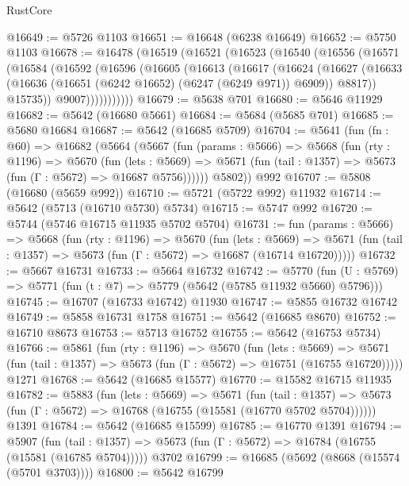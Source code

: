 \begin{lexlean}{RustCore}
\begin{coremodule}
@16649 := @5726 @1103
@16651 := @16648 (@6238 @16649)
@16652 := @5750 @1103
@16678 := @16478
    (@16519
      (@16521
        (@16523
          (@16540
            (@16556
              (@16571
                (@16584
                  (@16592
                    (@16596
                      (@16605
                        (@16613
                          (@16617
                            (@16624
                              (@16627
                                (@16633
                                  (@16636 (@16651 (@6242 @16652) (@6247 (@6249 @971)) @6909))
                                  @8817))
                              @15735))
                          @9007)))))))))))
@16679 := @5638 @701
@16680 := @5646 @11929
@16682 := @5642 (@16680 @5661)
@16684 := @5684 (@5685 @701)
@16685 := @5680 @16684
@16687 := @5642 (@16685 @5709)
@16704 := @5641
    (fun (fn : @60) =>
    @16682
      (@5664
        (@5667
          (fun (params : @5666) =>
          @5668
            (fun (rty : @1196) =>
            @5670
              (fun (lets : @5669) =>
              @5671 (fun (tail : @1357) => @5673 (fun (Γ : @5672) => @16687 @5756))))))
        @5802))
    @992
@16707 := @5808 (@16680 (@5659 @992))
@16710 := @5721 (@5722 @992) @11932
@16714 := @5642 (@5713 (@16710 @5730) @5734)
@16715 := @5747 @992
@16720 := @5744 (@5746 @16715 @11935 @5702 @5704)
@16731 := fun (params : @5666) =>
  @5668
    (fun (rty : @1196) =>
    @5670
      (fun (lets : @5669) =>
      @5671 (fun (tail : @1357) => @5673 (fun (Γ : @5672) => @16687 (@16714 @16720)))))
@16732 := @5667 @16731
@16733 := @5664 @16732
@16742 := @5770
    (fun (U : @5769) => @5771 (fun (t : @7) => @5779 (@5642 (@5785 @11932 @5660) @5796)))
@16745 := @16707 (@16733 @16742) @11930
@16747 := @5855 @16732 @16742
@16749 := @5858 @16731 @1758
@16751 := @5642 (@16685 @8670)
@16752 := @16710 @8673
@16753 := @5713 @16752
@16755 := @5642 (@16753 @5734)
@16766 := @5861
    (fun (rty : @1196) =>
    @5670
      (fun (lets : @5669) =>
      @5671 (fun (tail : @1357) => @5673 (fun (Γ : @5672) => @16751 (@16755 @16720)))))
    @1271
@16768 := @5642 (@16685 @15577)
@16770 := @15582 @16715 @11935
@16782 := @5883
    (fun (lets : @5669) =>
    @5671
      (fun (tail : @1357) =>
      @5673 (fun (Γ : @5672) => @16768 (@16755 (@15581 (@16770 @5702 @5704))))))
    @1391
@16784 := @5642 (@16685 @15599)
@16785 := @16770 @1391
@16794 := @5907
    (fun (tail : @1357) => @5673 (fun (Γ : @5672) => @16784 (@16755 (@15581 (@16785 @5704)))))
    @3702
@16799 := @16685 (@5692 (@8668 (@15574 (@5701 @3703))))
@16800 := @5642 @16799

\end{coremodule}
\end{lexlean}
